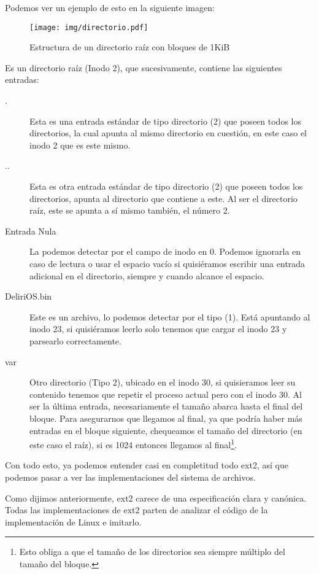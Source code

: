 Podemos ver un ejemplo de esto en la siguiente imagen:

\begin{figure}[H]
  \centering
  \texttt{[image: img/directorio.pdf]}
  \caption{Estructura de un directorio raíz con bloques de 1KiB}
\end{figure}

Es un directorio raíz (Inodo 2), que sucesivamente, contiene las siguientes entradas:

\begin{description}
\item[.] Esta es una entrada estándar de tipo directorio (2) que poseen todos los directorios, la cual apunta al mismo directorio en cuestión, en este caso el inodo 2 que es este mismo.
\item[..] Esta es otra entrada estándar de tipo directorio (2) que poseen todos los directorios, apunta al directorio que contiene a este. Al ser el directorio raíz, este se apunta a sí mismo también, el número 2.
\item[Entrada Nula] La podemos detectar por el campo de inodo en 0. Podemos ignorarla en caso de lectura o usar el espacio vacío si quisiéramos escribir una entrada adicional en el directorio, siempre y cuando alcance el espacio.
\item[DeliriOS.bin] Este es un archivo, lo podemos detectar por el tipo (1). Está apuntando al inodo 23, si quisiéramos leerlo solo tenemos que cargar el inodo 23 y parsearlo correctamente. 
\item[var] Otro directorio (Tipo 2), ubicado en el inodo 30, si quisieramos leer su contenido tenemos que repetir el proceso actual pero con el inodo 30. Al ser la última entrada, necesariamente el tamaño abarca hasta el final del bloque. Para asegurarnos que llegamos al final, ya que podría haber más entradas en el bloque siguiente, chequeamos el tamaño del directorio (en este caso el raíz), si es 1024 entonces llegamos al final\footnote{Esto obliga a que el tamaño de los directorios sea siempre múltiplo del tamaño del bloque.}.
\end{description}


Con todo esto, ya podemos entender casi en completitud todo ext2, así que podemos pasar a ver las implementaciones del sistema de archivos.


Como dijimos anteriormente, ext2 carece de una especificación clara y canónica.
Todas las implementaciones de ext2 parten de analizar el código de la implementación de Linux e imitarlo.

